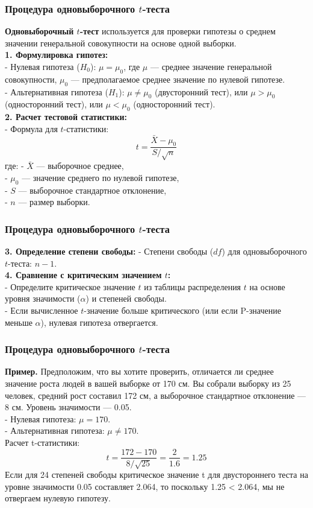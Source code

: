 \documentclass[aspectratio=169]{beamer}
\begin{document}
\begin{frame}
\frametitle{Процедура одновыборочного $t$-теста}
{\bf Одновыборочный $t$-тест} используется для проверки гипотезы о среднем значении генеральной совокупности на основе одной выборки.\\
{\bf 1. Формулировка гипотез:}\\
- Нулевая гипотеза ($H_0$): \( \mu = \mu_0 \), где \( \mu \) — среднее значение генеральной совокупности, \( \mu_0 \) — предполагаемое среднее значение по нулевой гипотезе.\\
- Альтернативная гипотеза ($H_1$): \( \mu \ne \mu_0 \) (двусторонний тест), или \( \mu > \mu_0 \) (односторонний тест), или \( \mu < \mu_0 \) (односторонний тест).\\
{\bf 2. Расчет тестовой статистики:}\\
- Формула для $t$-статистики:
     \[
     t = \frac{\bar{X} - \mu_0}{S / \sqrt{n}}
     \]
где:
- \( \bar{X} \) — выборочное среднее,\\
- \( \mu_0 \) — значение среднего по нулевой гипотезе,\\
- \( S \) — выборочное стандартное отклонение,\\
- \( n \) — размер выборки.\\
\end{frame}

\begin{frame}
\frametitle{Процедура одновыборочного $t$-теста}
{\bf 3. Определение степени свободы:}
- Степени свободы ($df$) для одновыборочного $t$-теста: \( n - 1 \).\\
{\bf 4. Сравнение с критическим значением $t$:}\\
- Определите критическое значение $t$ из таблицы распределения $t$ на основе уровня значимости ($\alpha$) и степеней свободы.\\
- Если вычисленное $t$-значение больше критического (или если P-значение меньше $\alpha$), нулевая гипотеза отвергается.
\end{frame}

\begin{frame}
\frametitle{Процедура одновыборочного $t$-теста}
{\bf Пример.} Предположим, что вы хотите проверить, отличается ли среднее значение роста людей в вашей выборке от 170 см. Вы собрали выборку из 25 человек, средний рост составил 172 см, а выборочное стандартное отклонение — 8 см. Уровень значимости — 0.05.\\
- Нулевая гипотеза: \( \mu = 170 \).\\
- Альтернативная гипотеза: \( \mu \ne 170 \).\\
Расчет t-статистики:
\[
t = \frac{172 - 170}{8 / \sqrt{25}} = \frac{2}{1.6} = 1.25
\]
Если для 24 степеней свободы критическое значение t для двустороннего теста на уровне значимости 0.05 составляет 2.064, то поскольку 1.25 < 2.064, мы не отвергаем нулевую гипотезу.
\end{frame}
\end{document}
